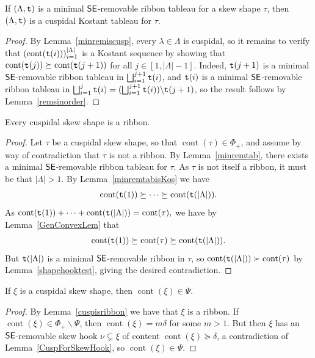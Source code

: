 \documentclass[Unicode,ALCO]{cedram}
\newcommand{\0}{{\bar 0}}
\newcommand{\ttt}{{\tt t}}
\newcommand{\ssee}{{\sf SE}}
\def\cont{{\operatorname{cont}}}
\begin{document}
\begin{lemma}\label{minremtabisKos}
If \((\Lambda,\ttt)\) is a minimal \(\ssee\)-removable ribbon tableau for a skew shape \(\tau\), then \((\Lambda,\ttt)\) is a cuspidal Kostant tableau for \(\tau\).
\end{lemma}
\begin{proof}
By Lemma~\ref{minremiscusp}, every \(\lambda \in \Lambda\) is cuspidal, so it remains to verify that \((\cont(\ttt(i)))_{i=1}^{|\Lambda|}\) is a Kostant sequence by showing that \(\cont(\ttt(j)) \succeq \cont(\ttt(j+1))\) for all \(j \in [1,|\Lambda|-1]\). Indeed, \(\ttt(j+1)\) is a minimal \(\ssee\)-removable ribbon tableau in \(\bigsqcup_{i=1}^{j+1}\ttt(i)\), and \(\ttt(i)\) is a minimal \(\ssee\)-removable ribbon tableau in \(\bigsqcup_{i=1}^{j} \ttt(i)= (\bigsqcup_{i=1}^{j+1}\ttt(i)) \backslash \ttt(j+1)\), so the result follows by Lemma~\ref{remsinorder}.
\end{proof}

\begin{lemma}\label{cuspisribbon}
Every cuspidal skew shape is a ribbon.
\end{lemma}
\begin{proof}
Let \(\tau\) be a cuspidal skew shape, so that \(\cont(\tau) \in \Phi_+\), and assume by way of contradiction that \(\tau\) is not a ribbon. By Lemma~\ref{minremtab}, there exists a minimal \(\ssee\)-removable ribbon tableau for \(\tau\). As \(\tau\) is not itself a ribbon, it must be that \(|\Lambda|>1\). By Lemma~\ref{minremtabisKos} we have 
\begin{align*}
\cont(\ttt(1)) \succeq \cdots \succeq \cont(\ttt(|\Lambda|)).
\end{align*}
As
\(
\cont(\ttt(1)) + \cdots + \cont(\ttt(|\Lambda|)) = \cont(\tau), 
\)
we have by Lemma~\ref{GenConvexLem} that
\begin{align*}
\cont(\ttt(1)) \succeq \cont(\tau)\succeq \cont(\ttt(|\Lambda|)).
\end{align*}
But \(\ttt(|\Lambda|)\) is a minimal \(\ssee\)-removable ribbon in \(\tau\), so \(\cont(\ttt(|\Lambda|)) \succ \cont(\tau)\) by Lemma~\ref{shapehooktest}, giving the desired contradiction.
\end{proof}

\begin{lemma}\label{cuspisindiv}
If \(\xi\) is a cuspidal skew shape, then \(\cont(\xi) \in \Psi\).
\end{lemma}
\begin{proof}
By Lemma~\ref{cuspisribbon} we have that \(\xi\) is a ribbon. If \(\cont(\xi) \in \Phi_+ \backslash \Psi\), then \(\cont(\xi) = m\delta\) for some \(m >1\). But then \(\xi\) has an \(\ssee\)-removable skew hook \(\nu \subsetneq \xi\) of content \(\cont(\xi) \succeq \delta\), a contradiction of Lemma~\ref{CuspForSkewHook}, so \(\cont(\xi) \in \Psi\).
\end{proof}
\end{document}
